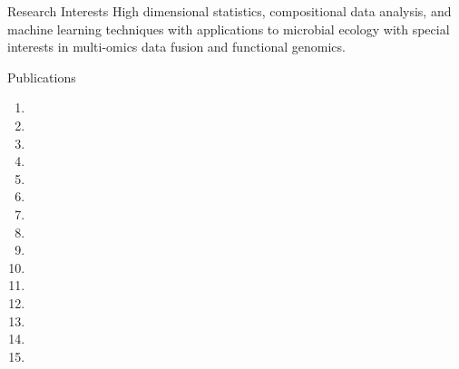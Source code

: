 \documentclass{resume} %
\begin{document}
\begin{rSection}{Research Interests}
  High dimensional statistics, compositional data analysis, and machine learning techniques with applications to microbial ecology with special interests in multi-omics data fusion and functional genomics.
\end{rSection}
\begin{rSection}{Publications}
  \begin{enumerate}
    \item {}
    \item {}
    \item {}
    \item {}
    \item {}
    \item {}
    \item {}
    \item {}
    \item {}
    \item {}
    \item {}
    \item {}
    \item {}
    \item {}
    \item {}
  \end{enumerate}
\end{rSection}
\end{document}
